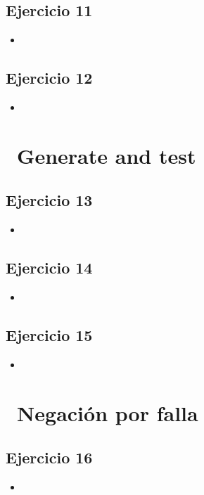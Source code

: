 \documentclass[10pt,a4paper]{article}
\begin{document}
\subsection{Ejercicio 11}
\begin{itemize}
\item
\end{itemize}

\subsection{Ejercicio 12}
\begin{itemize}
\item
\end{itemize}
\section*{\ Generate and test}

\subsection{Ejercicio 13}
\begin{itemize}
\item
\end{itemize}

\subsection{Ejercicio 14}
\begin{itemize}
\item
\end{itemize}

\subsection{Ejercicio 15}
\begin{itemize}
\item
\end{itemize}
\section*{\ Negación por falla}

\subsection{Ejercicio 16}
\begin{itemize}
\item
\end{itemize}
\end{document}
